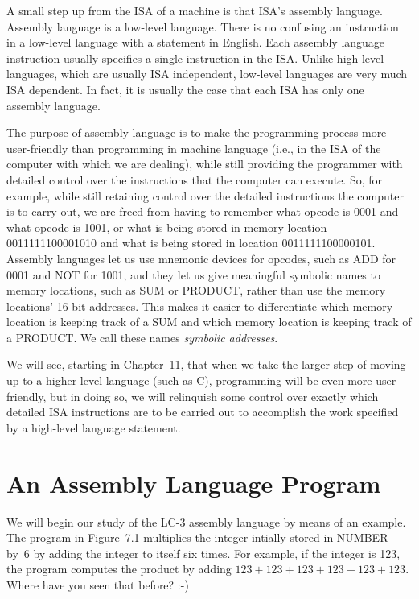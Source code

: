 \documentclass{patt}
\begin{document}
A small step up from the ISA of a machine is that ISA's assembly
language. Assembly language is a low-level language. There is no
 confusing an instruction in a low-level
language with a statement in English. Each assembly language
instruction usually specifies a single instruction in the ISA. Unlike
high-level languages, which are usually ISA independent, low-level
languages are very much ISA dependent. In fact, it is usually the case
that each ISA has only one assembly language.

The purpose of assembly language is to make the programming
process more user-friendly than programming in machine language
(i.e., in the ISA of the computer with which we are dealing), while
still providing the programmer with detailed control over the
instructions that the computer can execute. So, for example, while
still retaining control over the detailed instructions the
computer is to carry out, we are freed from having to remember
what opcode is 0001 and what opcode is 1001, or what is being
stored in memory location 0011111100001010 and what is being
stored in location 0011111100000101.  Assembly languages let us
use mnemonic devices for opcodes, such as ADD for 0001 and NOT for 1001, 
and they
let us give meaningful symbolic names to memory locations, such as
SUM or \nobreak PRODUCT, rather than use the memory locations'
16-bit addresses.
This makes it easier to differentiate which memory location is
keeping track of a SUM and which memory location is keeping track
of a PRODUCT. We call these names {\it symbolic addresses}.

We will see, starting in Chapter~11, that when we take the larger step
of moving up to a higher-level language (such as C), programming will
be even more user-friendly, but in doing so, we will relinquish some control 
over exactly
which detailed ISA instructions are to be carried out to accomplish the
work specified by a high-level language statement.

\vspace{-6pt}

\section{An Assembly Language Program}
We will begin our study of the LC-3 assembly language by means of an
example.  The program in Figure~7.1 multiplies the integer intially
stored in NUMBER by~6 by adding the integer to itself six times.  For
example, if the integer is 123, the program computes the product by
adding $123 + 123 + 123 + 123 + 123 + 123$.
Where have you seen that before?  :-)
\end{document}
